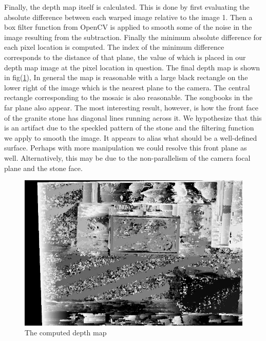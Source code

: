 \documentclass[a4paper]{article}
\begin{document}
Finally, the depth map itself is calculated.  This is done by first evaluating the absolute difference between each warped image relative to the image 1.  Then  a box filter function from OpenCV is applied to smooth some of the noise in the image resulting from the subtraction.  Finally the minimum absolute difference for each pixel location is computed.  The index of the minimum difference corresponds to the distance of that plane, the value of which is placed in our depth map image at the pixel location in question.  The final depth map is shown in fig(\ref{fig:depth}),  In general the map is reasonable with a large black rectangle on the lower right of the image which is the nearest plane to the camera.  The central rectangle corresponding to the mosaic is also reasonable. The songbooks in the far plane also appear.  The most interesting result, however, is how the front face of the granite stone has diagonal lines running across it.  We hypothesize that this is an artifact due to the speckled pattern of the stone and the filtering function we apply to smooth the image. It appears to alias what should be a well-defined surface.  Perhaps with more manipulation we could resolve this front plane as well. Alternatively, this may be due to the non-parallelism of the camera focal plane and the stone face. 
 \begin{figure}[htb!]
    \includegraphics[width=\textwidth]{../ImDepthMap}
    \caption{The computed depth map}
    \label{fig:depth}
\end{figure}
\FloatBarrier
\end{document}
